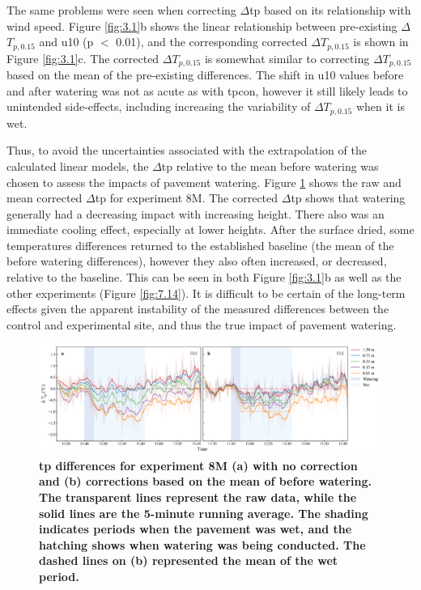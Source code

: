 \documentclass[final,3p,times,authoryear]{elsarticle}
\begin{document}
The same problems were seen when correcting $\Delta$\gls{tp} based on its relationship with wind speed. Figure \ref{fig:3.1}b shows the linear relationship between pre-existing $\Delta$$T_{p,0.15}$ and \gls{u10} (\gls{p} $<$ 0.01), and the corresponding corrected $\Delta$$T_{p,0.15}$ is shown in Figure \ref{fig:3.1}c. The corrected $\Delta$$T_{p,0.15}$ is somewhat similar to correcting $\Delta$$T_{p,0.15}$ based on the mean of the pre-existing differences. The shift in \gls{u10} values before and after watering was not as acute as with \gls{tpcon}, however it still likely leads to unintended side-effects, including increasing the variability of $\Delta$$T_{p,0.15}$ when it is wet.

Thus, to avoid the uncertainties associated with the extrapolation of the calculated linear models, the $\Delta$\gls{tp} relative to the mean before watering was chosen to assess the impacts of pavement watering. Figure \ref{fig:3.2} shows the raw and mean corrected $\Delta$\gls{tp} for experiment 8M. The corrected $\Delta$\gls{tp} shows that watering generally had a decreasing impact with increasing height. There also was an immediate cooling effect, especially at lower heights. After the surface dried, some temperatures differences returned to the established baseline (the mean of the before watering differences), however they also often increased, or decreased, relative to the baseline. This can be seen in both Figure \ref{fig:3.1}b as well as the other experiments (Figure \ref{fig:7.14}). It is difficult to be certain of the long-term effects given the apparent instability of the measured differences between the control and experimental site, and thus the true impact of pavement watering.

\begin{figure}
\centering
\includegraphics[trim={0 0 0 0},clip,scale=1.1]{pict013.png}
\caption{\bf \gls{tp} differences for experiment 8M (a) with no correction and (b) corrections based on the mean of before watering. The transparent lines represent the raw data, while the solid lines are the 5-minute running average. The shading indicates periods when the pavement was wet, and the hatching shows when watering was being conducted. The dashed lines on (b) represented the mean of the wet period.}
 \label{fig:3.2}
\end{figure}
\end{document}
